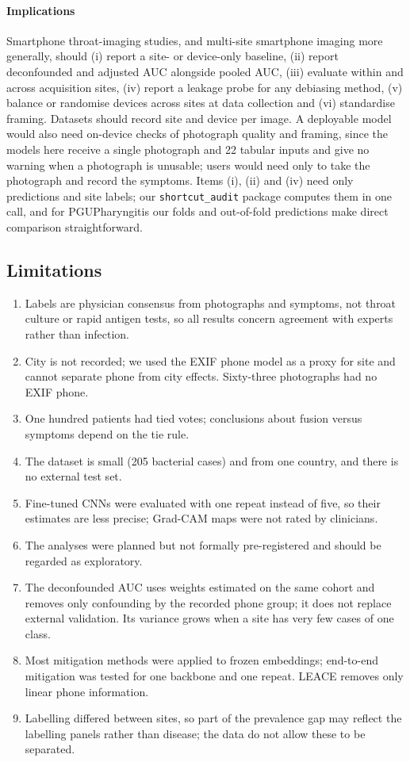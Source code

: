 \documentclass[preprint,12pt]{elsarticle}
\begin{document}
\paragraph{Implications} Smartphone throat-imaging studies, and multi-site smartphone imaging more generally, should (i) report a site- or device-only baseline, (ii) report deconfounded and adjusted AUC alongside pooled AUC, (iii) evaluate within and across acquisition sites, (iv) report a leakage probe for any debiasing method, (v) balance or randomise devices across sites at data collection and (vi) standardise framing. Datasets should record site and device per image. A deployable model would also need on-device checks of photograph quality and framing, since the models here receive a single photograph and 22 tabular inputs and give no warning when a photograph is unusable; users would need only to take the photograph and record the symptoms. Items (i), (ii) and (iv) need only predictions and site labels; our \texttt{shortcut\_audit} package computes them in one call, and for PGUPharyngitis our folds and out-of-fold predictions make direct comparison straightforward.

\subsection{Limitations}

\begin{enumerate}
\item Labels are physician consensus from photographs and symptoms, not throat culture or rapid antigen tests, so all results concern agreement with experts rather than infection.
\item City is not recorded; we used the EXIF phone model as a proxy for site and cannot separate phone from city effects. Sixty-three photographs had no EXIF phone.
\item One hundred patients had tied votes; conclusions about fusion versus symptoms depend on the tie rule.
\item The dataset is small (205 bacterial cases) and from one country, and there is no external test set.
\item Fine-tuned CNNs were evaluated with one repeat instead of five, so their estimates are less precise; Grad-CAM maps were not rated by clinicians.
\item The analyses were planned but not formally pre-registered and should be regarded as exploratory.
\item The deconfounded AUC uses weights estimated on the same cohort and removes only confounding by the recorded phone group; it does not replace external validation. Its variance grows when a site has very few cases of one class.
\item Most mitigation methods were applied to frozen embeddings; end-to-end mitigation was tested for one backbone and one repeat. LEACE removes only linear phone information.
\item Labelling differed between sites, so part of the prevalence gap may reflect the labelling panels rather than disease; the data do not allow these to be separated.
\end{enumerate}
\end{document}
